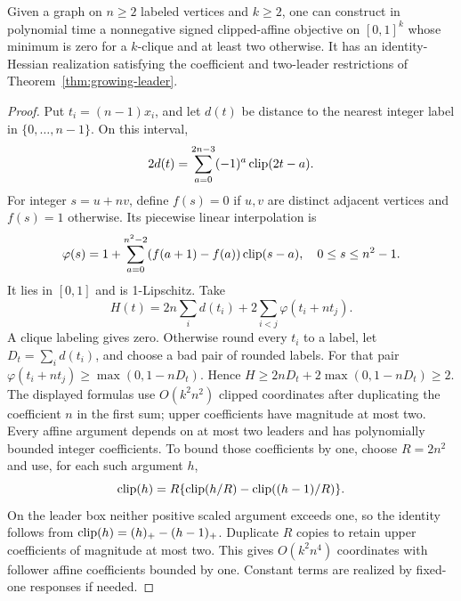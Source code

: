 \begin{proposition}\label{prop:mixed-radix}
Given a graph on \(n\ge2\) labeled vertices and \(k\ge2\), one can construct in
polynomial time a nonnegative signed clipped-affine objective on \([0,1]^k\)
whose minimum is zero for a \(k\)-clique and at least two otherwise. It has an
identity-Hessian realization satisfying the coefficient and two-leader
restrictions of Theorem~\ref{thm:growing-leader}.
\end{proposition}
\begin{proof}
Put \(t_i=(n-1)x_i\), and let \(d(t)\) be distance to the nearest integer label
in \(\{0,\ldots,n-1\}\). On this interval,
\[
 2d(t)=\sum_{a=0}^{2n-3}(-1)^a\operatorname{clip}(2t-a).
\]
For integer \(s=u+nv\), define \(f(s)=0\) if \(u,v\) are distinct adjacent
vertices and \(f(s)=1\) otherwise. Its piecewise linear interpolation is
\[
 \varphi(s)=1+\sum_{a=0}^{n^2-2}(f(a+1)-f(a))\operatorname{clip}(s-a),
 \quad 0\le s\le n^2-1.
\]
It lies in \([0,1]\) and is 1-Lipschitz. Take
\[
 H(t)=2n\sum_i d(t_i)+2\sum_{i<j}\varphi(t_i+nt_j).
\]
A clique labeling gives zero. Otherwise round every \(t_i\) to a label, let
\(D_t=\sum_i d(t_i)\), and choose a bad pair of rounded labels. For that pair
\(\varphi(t_i+nt_j)\ge\max(0,1-nD_t)\). Hence
\(H\ge2nD_t+2\max(0,1-nD_t)\ge2\).
The displayed formulas use \(O(k^2n^2)\) clipped coordinates after duplicating
the coefficient \(n\) in the first sum; upper coefficients have magnitude at
most two. Every affine argument depends on at most two leaders and has
polynomially bounded integer coefficients. To bound those coefficients by one,
choose \(R=2n^2\) and use, for each such argument \(h\),
\[
 \operatorname{clip}(h)=R\{\operatorname{clip}(h/R)-\operatorname{clip}((h-1)/R)\}.
\]
On the leader box neither positive scaled argument exceeds one, so the
identity follows from \(\operatorname{clip}(h)=(h)_+-(h-1)_+\). Duplicate \(R\) copies to
retain upper coefficients of magnitude at most two. This gives
\(O(k^2n^4)\) coordinates with follower affine coefficients bounded by one.
Constant terms are realized by fixed-one responses if needed.
\end{proof}

